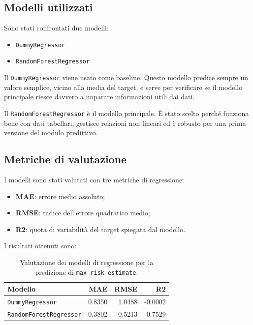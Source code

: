 \documentclass[12pt,a4paper]{article}
\begin{document}
\subsection{Modelli utilizzati}

Sono stati confrontati due modelli:

\begin{itemize}
    \item \texttt{DummyRegressor}
    \item \texttt{RandomForestRegressor}
\end{itemize}

Il \texttt{DummyRegressor} viene usato come baseline. Questo modello predice sempre un valore semplice, vicino alla media del target, e serve per verificare se il modello principale riesce davvero a imparare informazioni utili dai dati.

Il \texttt{RandomForestRegressor} è il modello principale. È stato scelto perché funziona bene con dati tabellari, gestisce relazioni non lineari ed è robusto per una prima versione del modulo predittivo.

\subsection{Metriche di valutazione}

I modelli sono stati valutati con tre metriche di regressione:

\begin{itemize}
    \item \textbf{MAE}: errore medio assoluto;
    \item \textbf{RMSE}: radice dell'errore quadratico medio;
    \item \textbf{R2}: quota di variabilità del target spiegata dal modello.
\end{itemize}

I risultati ottenuti sono:

\begin{table}[H]
\centering
\begin{tabular}{lrrr}
\toprule
Modello & MAE & RMSE & R2 \\
\midrule
\texttt{DummyRegressor} & 0.8350 & 1.0488 & -0.0002 \\
\texttt{RandomForestRegressor} & 0.3802 & 0.5213 & 0.7529 \\
\bottomrule
\end{tabular}
\caption{Valutazione dei modelli di regressione per la predizione di \texttt{max\_risk\_estimate}.}
\end{table}
\end{document}
